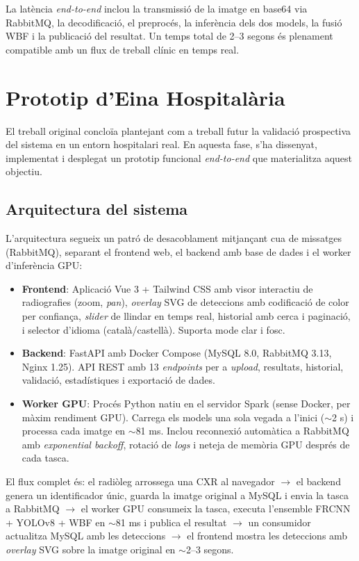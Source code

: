 \documentclass[conference]{IEEEtran}
\begin{document}
La latència \textit{end-to-end} inclou la transmissió de la imatge en base64 via RabbitMQ, la decodificació, el preprocés, la inferència dels dos models, la fusió WBF i la publicació del resultat. Un temps total de 2--3 segons és plenament compatible amb un flux de treball clínic en temps real.

\section{Prototip d'Eina Hospitalària}

El treball original concloïa plantejant com a treball futur la validació prospectiva del sistema en un entorn hospitalari real. En aquesta fase, s'ha dissenyat, implementat i desplegat un prototip funcional \textit{end-to-end} que materialitza aquest objectiu.

\subsection{Arquitectura del sistema}

L'arquitectura segueix un patró de desacoblament mitjançant cua de missatges (RabbitMQ), separant el frontend web, el backend amb base de dades i el worker d'inferència GPU:

\begin{itemize}
    \item \textbf{Frontend}: Aplicació Vue 3 + Tailwind CSS amb visor interactiu de radiografies (zoom, \textit{pan}), \textit{overlay} SVG de deteccions amb codificació de color per confiança, \textit{slider} de llindar en temps real, historial amb cerca i paginació, i selector d'idioma (català/castellà). Suporta mode clar i fosc.
    \item \textbf{Backend}: FastAPI amb Docker Compose (MySQL 8.0, RabbitMQ 3.13, Nginx 1.25). API REST amb 13 \textit{endpoints} per a \textit{upload}, resultats, historial, validació, estadístiques i exportació de dades.
    \item \textbf{Worker GPU}: Procés Python natiu en el servidor Spark (sense Docker, per màxim rendiment GPU). Carrega els models una sola vegada a l'inici ($\sim$2 s) i processa cada imatge en $\sim$81 ms. Inclou reconnexió automàtica a RabbitMQ amb \textit{exponential backoff}, rotació de \textit{logs} i neteja de memòria GPU després de cada tasca.
\end{itemize}

El flux complet és: el radiòleg arrossega una CXR al navegador $\rightarrow$ el backend genera un identificador únic, guarda la imatge original a MySQL i envia la tasca a RabbitMQ $\rightarrow$ el worker GPU consumeix la tasca, executa l'ensemble FRCNN + YOLOv8 + WBF en $\sim$81 ms i publica el resultat $\rightarrow$ un consumidor actualitza MySQL amb les deteccions $\rightarrow$ el frontend mostra les deteccions amb \textit{overlay} SVG sobre la imatge original en $\sim$2--3 segons.
\end{document}
